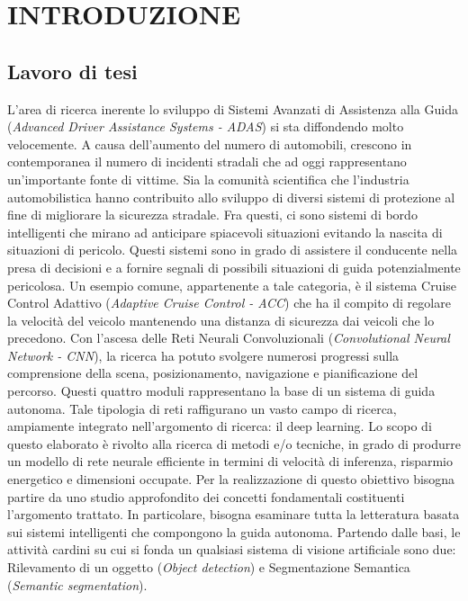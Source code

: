 
\chapter{INTRODUZIONE}
\label{Capitolo1}
\thispagestyle{empty}

\section{Lavoro di tesi}
L'area di ricerca inerente lo sviluppo di Sistemi Avanzati di Assistenza 
alla Guida (\emph{Advanced Driver Assistance Systems - ADAS}) si sta diffondendo 
molto velocemente. A causa dell'aumento del numero di automobili, 
crescono in contemporanea il numero di incidenti stradali che ad oggi rappresentano 
un'importante fonte di vittime. Sia la comunità scientifica che l'industria automobilistica hanno contribuito allo sviluppo di diversi sistemi di protezione al fine di migliorare la sicurezza stradale.  Fra questi, ci sono sistemi di bordo intelligenti che mirano ad anticipare spiacevoli situazioni evitando la nascita di situazioni di pericolo. Questi sistemi sono in grado di assistere il conducente nella presa di decisioni e a fornire segnali di possibili situazioni di guida potenzialmente pericolosa. Un esempio comune, appartenente a tale categoria, è il sistema Cruise Control Adattivo (\emph{Adaptive Cruise Control - ACC}) che ha il compito di regolare la velocità del veicolo mantenendo una distanza di sicurezza dai veicoli che lo precedono.
Con l'ascesa delle Reti Neurali Convoluzionali (\emph{Convolutional Neural Network - CNN}), la ricerca ha potuto svolgere numerosi progressi sulla comprensione della scena, posizionamento, navigazione e pianificazione del percorso. Questi quattro moduli rappresentano la base di un sistema di guida autonoma. Tale tipologia di reti raffigurano un vasto campo di ricerca, ampiamente integrato nell'argomento di ricerca: il deep learning. Lo scopo di questo elaborato è rivolto alla ricerca di metodi e/o tecniche, in grado di produrre un modello di rete neurale efficiente in termini di velocità di inferenza, risparmio energetico e dimensioni occupate. Per la realizzazione di questo obiettivo bisogna partire da uno studio approfondito dei concetti fondamentali costituenti l'argomento trattato. In particolare, bisogna esaminare tutta la letteratura basata sui sistemi intelligenti che compongono la guida autonoma. Partendo dalle basi, le attività cardini su cui si fonda un qualsiasi sistema di visione artificiale sono due: Rilevamento di un oggetto (\emph{Object detection}) e Segmentazione Semantica (\emph{Semantic segmentation}).
